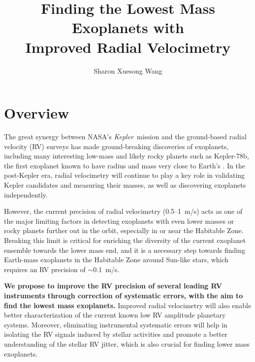 \documentclass[12pt]{article}
\def\mps{m/s}
\def\kepler{{\it Kepler}}
\begin{document}

\title{\vspace{-45pt} \bf \Large Finding the Lowest Mass Exoplanets with
  \\ Improved Radial Velocimetry \vspace{-6pt}}
\author{\normalsize Sharon Xuesong Wang}
\date{}
\maketitle

\vspace{-30pt}
\section{Overview}

The great synergy between NASA's \kepler\ mission and the ground-based
radial velocity (RV) surveys has made ground-breaking discoveries of
exoplanets, including many interesting low-mass \citep{marcy2014} and
likely rocky planets \citep{weiss2013} such as Kepler-78b, the first
exoplanet known to have radius and mass very close to Earth's
\citep{howard2013,pepe2013}. In the post-Kepler era, radial
velocimetry will continue to play a key role in validating Kepler
candidates and measuring their masses, as well as discovering
exoplanets independently.

However, the current precision of radial velocimetry (0.5--1~\mps)
acts as one of the major limiting factors in detecting exoplanets with
even lower masses or rocky planets further out in the orbit,
especially in or near the Habitable Zone. Breaking this limit is
critical for enriching the diversity of the current exoplanet ensemble
towards the lower mass end, and it is a necessary step towards finding
Earth-mass exoplanets in the Habitable Zone around Sun-like stars,
which requires an RV precision of $\sim$0.1~\mps.

\textbf{We propose to improve the RV precision of several leading RV
  instruments through correction of systematic errors, with the aim to
  find the lowest mass exoplanets.} Improved radial velocimetry will
also enable better characterization of the current known low RV
amplitude planetary systems. Moreover, eliminating instrumental
systematic errors will help in isolating the RV signals induced by
stellar activities and promote a better understanding of the stellar
RV jitter, which is also crucial for finding lower mass exoplanets.
\end{document}
